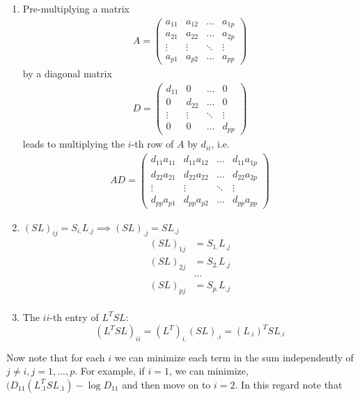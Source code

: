 \documentclass[12pt, leqno]{article}
\begin{document}
\begin{enumerate} 
\item Pre-multiplying a matrix
\begin{align*}
A = \begin{pmatrix} 
a_{11} & a_{12} & \hdots & a_{1p} \\
a_{21} &a_{22} & \hdots&  a_{2p} \\
\vdots & \vdots &\ddots& \vdots\\
a_{p1} &a_{p2} & \hdots & a_{pp} 
\end{pmatrix}
\end{align*}
by a diagonal matrix 
\begin{align*}
D = \begin{pmatrix} 
d_{11} & 0 & \hdots & 0 \\
0 &d_{22} & \hdots&  0 \\
\vdots & \vdots &\ddots& \vdots\\
0 &0 & \hdots & d_{pp} 
\end{pmatrix}
\end{align*}
leads to multiplying the $i$-th row of $A$ by $d_{ii}$, i.e.
\begin{align*}
AD = \begin{pmatrix} d_{11} a_{11} & d_{11} a_{12} & \hdots & d_{11} a_{1p} \\
d_{22} a_{21} &d_{22} a_{22} & \hdots&  d_{22} a_{2p} \\
\vdots & \vdots &\ddots& \vdots\\
d_{pp}  a_{p1} &d_{pp}  a_{p2} & \hdots &d_{pp}  a_{pp} 
\end{pmatrix}
\end{align*}
\item $(SL)_{ij} = S_{i.}L_{.j} \implies (SL)_{.j} = S L_{.j} $ 
\begin{align*}
(SL)_{1j} &= S_{1.}L_{.j} \\
(SL)_{2j} &= S_{2.}L_{.j} \\
&\hdots \\
(SL)_{pj} &= S_{p.}L_{.j} \\
\end{align*}
\item The $ii$-th entry of $L^T SL$:
 \[
(L^T SL)_{ii}  = (L^T)_{i.} (SL)_{.i} = (L_{.i})^T S L_{.i}
\]
\end{enumerate}
Now note that for each $i$ we can minimize each term in the sum
independently of $j \not= i, j = 1,...,p$. For example, if $i = 1$, we
can minimize, $(D_{11}(L_{.1}^TSL_{.1})-\log D_{11}$ and then move on
to $i = 2$. In this regard note that
\end{document}
